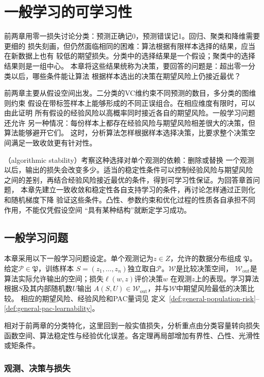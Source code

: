 \chapter{一般学习的可学习性}
\label{chap:convex-learning-and-stability}

前两章用零一损失讨论分类：预测正确记0，预测错误记1。回归、聚类和降维需要更细的
损失刻画，但仍然面临相同的困难：算法根据有限样本选择的结果，应当在新数据上也有
较低的期望损失。分类中的选择结果是一个假设；聚类中的选择结果则是一组中心。
本章将这些结果统称为决策，要回答的问题是：超出零一分类以后，哪些条件能让算法
根据样本选出的决策在期望风险上仍接近最优？

前两章主要从假设空间出发。二分类的VC维约束不同预测的数目，多分类的图维则约束
假设在带标签样本上能够形成的不同正误组合。在相应维度有限时，可以由此证明
所有假设的经验风险以高概率同时接近各自的期望风险。一般学习问题还允许
另一种情况：每份样本上都存在经验风险与期望风险相差很大的决策，但算法能够避开它们。
这时，分析算法怎样根据样本选择决策，比要求整个决策空间满足一致收敛更有针对性。

（algorithmic stability）考察这种选择对单个观测的依赖：删除或替换
一个观测以后，输出的损失会改变多少。适当的稳定性条件可以控制经验风险与期望风险
之间的差别，再结合经验风险接近最优的条件，得到可学习性保证。为回答章首问题，
本章先建立一致收敛和稳定性各自支持学习的条件，再讨论怎样通过正则化和随机梯度下降
验证这些条件。凸性、参数约束和优化过程的性质各自承担不同作用，不能仅凭假设空间
“具有某种结构”就断定学习成功。

\section{一般学习问题}
\label{sec:general-learning-problem}

本章采用以下一般学习问题设定。单个观测记为$z\in Z$，允许的数据分布组成
$\mathfrak P$。给定$\mathcal P\in\mathfrak P$，训练样本
$S=(z_1,\ldots,z_n)$独立取自$\mathcal P$。$\mathcal W$是比较决策空间，
$\mathcal W_{\mathrm{out}}$是算法实际允许输出的空间；损失$\ell(w,z)$评价决策$w$
在观测$z$上的表现。学习算法根据$S$及其内部随机数$U$输出
$A(S,U)\in\mathcal W_{\mathrm{out}}$，并与$\mathcal W$中期望风险最低的决策比较。
相应的期望风险、经验风险和PAC量词见
定义~\ref{def:general-population-risk}--\ref{def:general-pac-learnability}。

相对于前两章的分类特化，这里回到一般实值损失，分析重点由分类容量转向损失函数空间、算法稳定性与经验优化误差。各定理再局部增加有界性、凸性、光滑性或矩条件。

\subsection{观测、决策与损失}

